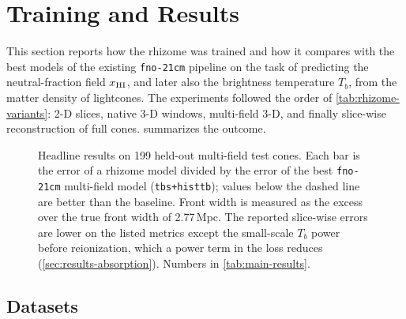 \section{Training and Results}
\label{sec:results}

This section reports how the rhizome was trained and how it compares with the best models of the existing \texttt{fno-21cm} pipeline on the task of predicting the neutral-fraction field $x_{\mathrm{HI}}$, and later also the brightness temperature $T_b$, from the matter density of \cmfast{} lightcones. The experiments followed the order of \cref{tab:rhizome-variants}: 2-D slices, native 3-D windows, multi-field 3-D, and finally slice-wise reconstruction of full cones.  summarizes the outcome.

\begin{figure}[!htbp]
  \centering
  \caption{Headline results on 199 held-out multi-field test cones. Each bar is the error of a rhizome model divided by the error of the best \texttt{fno-21cm} multi-field model (\texttt{tbs+histtb}); values below the dashed line are better than the baseline. Front width is measured as the excess over the true front width of 2.77\,Mpc. The reported slice-wise errors are lower on the listed metrics except the small-scale $T_b$ power before reionization, which a power term in the loss reduces (\cref{sec:results-absorption}). Numbers in \cref{tab:main-results}.}
  \label{fig:metric-ratios}
\end{figure}

\subsection{Datasets}
\label{sec:datasets}

